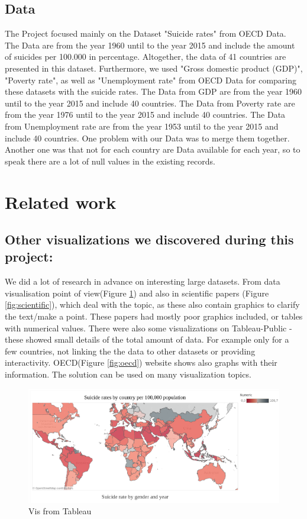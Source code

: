 \documentclass{vgtc}                          %
\begin{document}
\subsection{Data}

The Project focused mainly on the Dataset "Suicide rates" from OECD Data. The Data are from the year 1960 until to the year 2015 and include the amount of suicides per 100.000 in percentage. Altogether, the data of 41 countries are presented in this dataset. Furthermore, we used "Gross domestic product (GDP)", "Poverty rate", as well as "Unemployment rate" from OECD Data for comparing these datasets with the suicide rates.  The Data from GDP are from the year 1960 until to the year 2015 and include 40 countries. The Data from Poverty rate are from the year 1976 until to the year 2015 and include 40 countries. The Data from Unemployment rate are from the year 1953 until to the year 2015 and include 40 countries. One problem with our Data was to merge them together. Another one was that not for each country are Data available for each year, so to speak there are a lot of null values in the existing records.


\section{Related work}

\subsection{Other visualizations we discovered during this project:}

We did a lot of research in advance on interesting large datasets. From data visualisation point of view(Figure \ref{fig:tableau}) and also in scientific papers (Figure \ref{fig:scientific}), which deal with the topic, as these also contain graphics to clarify the text/make a point. These papers had mostly poor graphics included, or tables with numerical values. There were also some visualizations on Tableau-Public - these showed small details of the total amount of data. For example only for a few countries, not linking the the data to other datasets or providing interactivity. OECD(Figure \ref{fig:oecd}) website shows also graphs with their information. The solution can be used on many visualization topics.

\begin{figure}[tb]
\centering
\includegraphics[width=\columnwidth]{image/roman/researches.png}
\caption{Vis from Tableau}
\label{fig:tableau} 
\end{figure}
\end{document}
